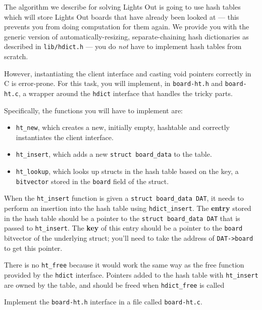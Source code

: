 \documentclass[12pt]{exam}
\begin{document}
The algorithm we describe for solving Lights Out is going to use hash
tables which will store Lights Out boards that have already been
looked at --- this prevents you from doing computation for them again.
We provide you with the generic version of automatically-resizing,
separate-chaining hash dictionaries as described in
\lstinline'lib/hdict.h' --- you do \emph{not} have to implement hash
tables from scratch.

However, instantiating the client interface and casting void pointers
correctly in C is error-prone. For this task, you will implement, in
\lstinline'board-ht.h' and \lstinline'board-ht.c', a wrapper around
the \lstinline'hdict' interface that handles the tricky parts.

Specifically, the functions you will have to implement are:

\begin{itemize}
\item%
  \lstinline'ht_new', which creates a new, initially empty, hashtable
  and correctly instantiates the client interface.
\item%
  \lstinline'ht_insert', which adds a new %
  \lstinline'struct board_data' %
  to the table.
\item%
  \lstinline'ht_lookup', which looks up structs in the hash table
  based on the key, a \lstinline'bitvector' stored in the
  \lstinline'board' field of the struct.
\end{itemize}

When the \lstinline'ht_insert' function is given a %
\lstinline'struct board_data DAT', %
it needs to perform an insertion into the hash table using
\lstinline'hdict_insert'. The \textbf{entry} stored in the hash table
should be a pointer to the \lstinline'struct board_data DAT' that is
passed to \lstinline'ht_insert'.  The \textbf{key} of this entry
should be a pointer to the \lstinline'board' bitvector of the
underlying struct; you'll need to take the address of
\lstinline'DAT->board' to get this pointer.

There is no \lstinline'ht_free' because it would work the same way as
the free function provided by the \lstinline'hdict' interface. Pointers
added to the hash table with \lstinline'ht_insert' are owned by the
table, and should be freed when \lstinline'hdict_free' is called

\begin{task}[6]
Implement the \lstinline'board-ht.h' interface in a file called
\lstinline'board-ht.c'.
\end{task}
\end{document}

